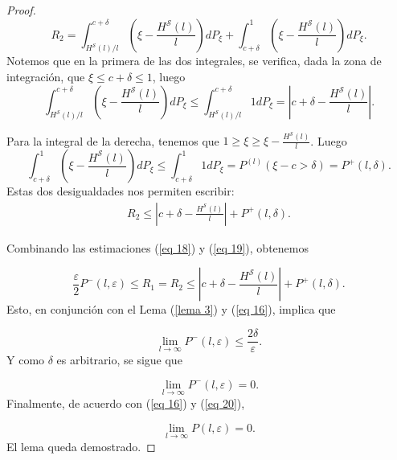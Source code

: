 \documentclass{report}
\begin{document}
\begin{proof}
    \begin{equation*}
        R_2 =  \int_{H^{\mathcal{S}}(l)/l}^{c + \delta} \left( \xi - \frac{H^{\mathcal{S}}(l)}{l} \right) dP_{\xi}
        + \int_{c + \delta}^{1} \left( \xi - \frac{H^{\mathcal{S}}(l)}{l} \right) dP_{\xi}.
    \end{equation*}
    Notemos que en la primera de las dos integrales, se verifica, dada la zona de integración, que \(\xi \leq c+\delta \leq 1\),
    luego
    \[
        \int_{H^{\mathcal{S}}(l)/l}^{c + \delta} \left( \xi - \frac{H^{\mathcal{S}}(l)}{l} \right) dP_{\xi} 
        \leq \int_{H^{\mathcal{S}}(l)/l}^{c + \delta} 1 dP_{\xi}
        = \left| c + \delta -  \frac{H^{\mathcal{S}}(l)}{l} \right|.
    \]\newline

    Para la integral de la derecha, tenemos que $1\geq\xi\geq \xi-\frac{H^{\mathcal{S}}(l)}{l}$. Luego
    \[
        \int_{c + \delta}^{1} \left( \xi - \frac{H^{\mathcal{S}}(l)}{l} \right) dP_{\xi}
        \leq \int_{c + \delta}^{1} 1 dP_{\xi} = P^{(l)}(\xi-c>\delta) = P^+(l, \delta).
    \]
    Estas dos desigualdades nos permiten escribir:
    \begin{equation}\label{eq 19}
        \begin{aligned}
          R_2\leq \left| c + \delta - \frac{H^{\mathcal{S}}(l)}{l} \right| + P^+(l, \delta).
        \end{aligned}
    \end{equation}\newline

    Combinando las estimaciones (\ref{eq 18}) y (\ref{eq 19}), obtenemos

    \begin{equation}
       \frac{\varepsilon}{2} P^-(l, \varepsilon) \leq R_1 = R_2 \leq \left| c + \delta - \frac{H^{\mathcal{S}}(l)}{l} \right| + P^+(l, \delta).
    \end{equation}
    Esto, en conjunción con el Lema (\ref{lema 3}) y (\ref{eq 16}), implica que

    \begin{equation*}
    \lim_{l \to \infty} P^-(l, \varepsilon) \leq \frac{2\delta}{\varepsilon}.
    \end{equation*}
    Y como \( \delta \) es arbitrario, se sigue que

    \begin{equation}\label{eq 20}
    \lim_{l \to \infty} P^-(l, \varepsilon) = 0.
    \end{equation}
    Finalmente, de acuerdo con (\ref{eq 16}) y (\ref{eq 20}),

    \begin{equation*}
    \lim_{l \to \infty} P(l, \varepsilon) = 0.
    \end{equation*}
    El lema queda demostrado.
\end{proof}
\bigskip
\end{document}
